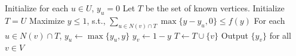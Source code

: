 \documentclass{article}
\begin{document}



%
%
%

\begin{algorithm}[h!]
\SetAlgoLined
\caption{$GreedyAllocation$ with allocation function $f(\cdot)$}
\label{alg:general greedy}
Initialize for each $u\in U$, $y_u = 0$\;
Let $T$ be the set of known vertices. Initialize $T=U$\;
{
Maximize $y\le 1$, s.t., $\sum_{u\in N(v)\cap T} \max\{y-y_u,0\} \leq f(y)$\;
For each $u\in N(v)\cap T$, $y_u \leftarrow \max\{ y_u, y\}$\;
$y_v \leftarrow 1-y$\;
$T\leftarrow T\cup \{v\}$\;
}
Output $\{y_v\}$ for all $v\in V$\;
\end{algorithm}



\end{document}
